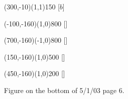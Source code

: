 \documentclass[12pt]{article}
\newcommand{\s}{\vspace{5mm}}
\begin{document}
\begin{figure}[htb]
\begin{egame}
\renewcommand{\egarrowstyle}{}

\putbranch(300,-10)(1,1){150}
\ib{}{}[$b$] 





\renewcommand{\egarrowstyle}{}

\putbranch(-100,-160)(1,0){800}
\ib{}{}[] 

\renewcommand{\egarrowstyle}{}

\putbranch(700,-160)(-1,0){800}
\ib{}{}[] 

\renewcommand{\egarrowstyle}{}

\putbranch(150,-160)(1,0){500}
\ib{}{}[] 



\renewcommand{\egarrowstyle}{}

\putbranch(450,-160)(1,0){200}
\ib{}{}[] 



%
\end{egame}
\hspace*{\fill}\s\s\s\s\s
\caption[]{Figure on the bottom of 5/1/03 page 6.}\label{f:seventeen}
\end{figure}
\end{document}

